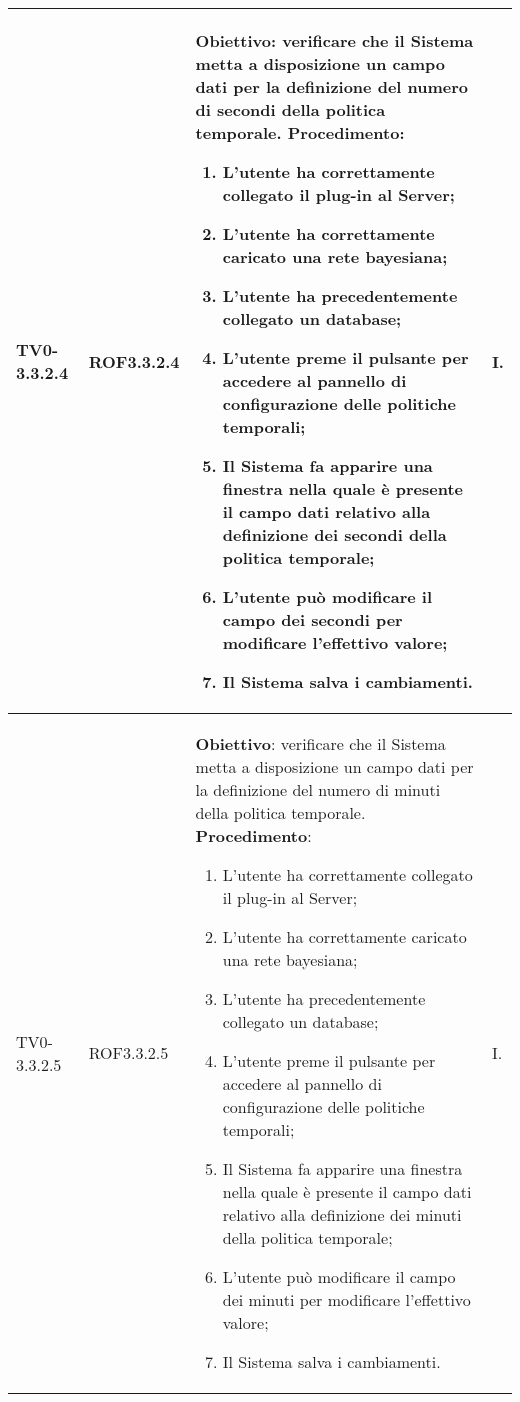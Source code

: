 \begin{longtable}{|C{.15\textwidth}|C{.13\textwidth}|m{.52\textwidth}|C{.08\textwidth}|}
TV0-3.3.2.4 & ROF3.3.2.4 &
	\textbf{Obiettivo}: verificare che il Sistema metta a disposizione un campo dati per la definizione del numero di secondi della politica temporale. \newline
	\textbf{Procedimento}:
	\begin{enumerate}
		\item L'utente ha correttamente collegato il plug-in al Server;
		\item L'utente ha correttamente caricato una rete bayesiana;
		\item L'utente ha precedentemente collegato un database;
		\item L'utente preme il pulsante per accedere al pannello di configurazione delle politiche temporali;
		\item Il Sistema fa apparire una finestra nella quale è presente il campo dati relativo alla definizione dei secondi della politica temporale;
		\item L'utente può modificare il campo dei secondi per modificare l'effettivo valore;
		\item Il Sistema salva i cambiamenti.
	\end{enumerate}
	& I. \\
\hline

TV0-3.3.2.5 & ROF3.3.2.5 &
	\textbf{Obiettivo}: verificare che il Sistema metta a disposizione un campo dati per la definizione del numero di minuti della politica temporale. \newline
	\textbf{Procedimento}:
	\begin{enumerate}
		\item L'utente ha correttamente collegato il plug-in al Server;
		\item L'utente ha correttamente caricato una rete bayesiana;
		\item L'utente ha precedentemente collegato un database;
		\item L'utente preme il pulsante per accedere al pannello di configurazione delle politiche temporali;
		\item Il Sistema fa apparire una finestra nella quale è presente il campo dati relativo alla definizione dei minuti della politica temporale;
		\item L'utente può modificare il campo dei minuti per modificare l'effettivo valore;
		\item Il Sistema salva i cambiamenti.
	\end{enumerate}
	& I. \\
\hline


\end{longtable}
